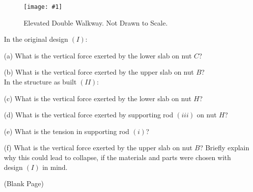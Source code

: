 \documentclass[11pt]{article}
\newcommand{\fig}[4]{
    \begin{figure}[H]
        \centering
        \texttt{[image: \#1]}
        \caption{#2}
        \label{exp4fit}
    \end{figure}
}
\theoremstyle{gangnamstyle}{\newtheorem{definition}{Definition}[]}
\theoremstyle{gangnamstyle}{\newtheorem{example}{Example}[]}
\theoremstyle{gangnamstyle}{\newtheorem{problem}{Problem}[]}
\begin{document}
\fig{figs/lab5/walkway.png}{Elevated Double Walkway. Not Drawn to Scale.}{0.8}{0}

\pagebreak

In the original design $(I)$:

(a) What is the vertical force exerted by the lower slab on nut $C$?

(b) What is the vertical force exerted by the upper slab on nut $B$? \\

In the structure as built $(II)$:

(c) What is the vertical force exerted by the lower slab on nut $H$?

(d) What is the vertical force exerted by supporting rod $(iii)$ on nut $H$?

(e) What is the tension in supporting rod $(i)$?

(f) What is the vertical force exerted by the upper slab on nut $B$? Briefly explain why this could lead to collapse, if the materials and parts were chosen with design $(I)$ in mind.

\pagebreak

\begin{center}
(Blank Page)
\end{center}

\pagebreak
\end{document}
